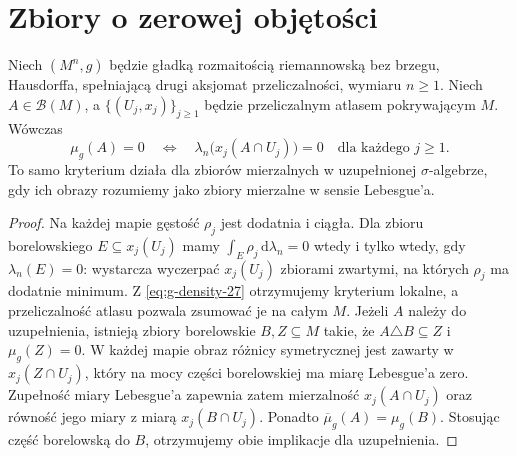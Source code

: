 \section{Zbiory o zerowej objętości}
\begin{twierdzenie}
\label{thm:null-local-27}
Niech $(M^n,g)$ będzie gładką rozmaitością riemannowską
bez brzegu, Hausdorffa, spełniającą drugi aksjomat przeliczalności,
wymiaru $n\ge1$. Niech $A\in\mathcal B(M)$, a
$\{(U_j,x_j)\}_{j\ge1}$ będzie przeliczalnym atlasem
pokrywającym $M$. Wówczas
\[
 \mu_g(A)=0\quad\Longleftrightarrow\quad
 \lambda_n\bigl(x_j(A\cap U_j)\bigr)=0
 \quad\text{dla każdego }j\ge1.
\]
To samo kryterium działa dla zbiorów mierzalnych
w uzupełnionej $\sigma$-algebrze, gdy ich obrazy
rozumiemy jako zbiory mierzalne w sensie Lebesgue'a.
\end{twierdzenie}
\begin{proof}
Na każdej mapie gęstość $\rho_j$ jest dodatnia
i ciągła. Dla zbioru borelowskiego $E\subseteq x_j(U_j)$
mamy $\int_E\rho_j\,\mathrm d\lambda_n=0$
wtedy i tylko wtedy, gdy $\lambda_n(E)=0$:
wystarcza wyczerpać $x_j(U_j)$ zbiorami zwartymi,
na których $\rho_j$ ma dodatnie minimum.
Z \eqref{eq:g-density-27} otrzymujemy kryterium
lokalne, a przeliczalność atlasu pozwala
zsumować je na całym $M$. Jeżeli $A$ należy do uzupełnienia, istnieją zbiory borelowskie
$B,Z\subseteq M$ takie, że $A\triangle B\subseteq Z$ i $\mu_g(Z)=0$.
W każdej mapie obraz różnicy symetrycznej jest zawarty w
$x_j(Z\cap U_j)$, który na mocy części borelowskiej ma miarę
Lebesgue'a zero. Zupełność miary Lebesgue'a zapewnia zatem
mierzalność $x_j(A\cap U_j)$ oraz równość jego miary z miarą
$x_j(B\cap U_j)$. Ponadto $\overline\mu_g(A)=\mu_g(B)$.
Stosując część borelowską do $B$, otrzymujemy obie implikacje
dla uzupełnienia.
\end{proof}

